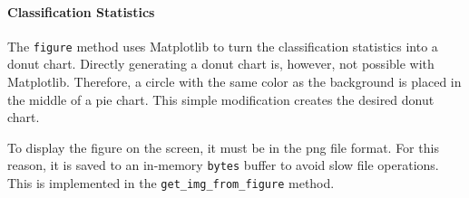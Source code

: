 \paragraph{Classification Statistics}
The \texttt{figure} method uses Matplotlib to turn the classification statistics into a donut chart.
Directly generating a donut chart is, however, not possible with Matplotlib.
Therefore, a circle with the same color as the background is placed in the middle of a pie chart.
This simple modification creates the desired donut chart.

To display the figure on the screen, it must be in the \acrshort{png} file format.
For this reason, it is saved to an in-memory \texttt{bytes} buffer to avoid slow file operations.
This is implemented in the \texttt{get\_img\_from\_figure} method.

